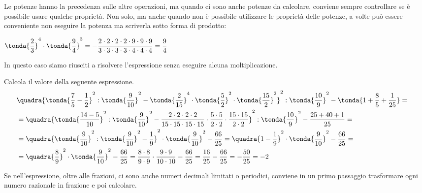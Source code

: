 Le potenze hanno la precedenza sulle altre operazioni, ma quando ci sono 
anche potenze da calcolare, conviene sempre controllare se è possibile usare 
qualche proprietà. Non solo, ma anche quando non è possibile utilizzare le 
proprietà delle potenze, a volte può essere conveniente non eseguire la 
potenza ma scriverla sotto forma di prodotto:

\begin{esempio}{}{}
\(\tonda{\dfrac{2}{3}}^4 \cdot \tonda{\dfrac{9}{4}}^3  = 
-\dfrac{2\cdot2\cdot2\cdot2\cdot9\cdot9\cdot9}
      {3\cdot3\cdot3\cdot3\cdot4\cdot4\cdot4} = \dfrac{9}{4}\)
\end{esempio}

In questo caso siamo riusciti a risolvere l'espressione senza eseguire
alcuna moltiplicazione.


\begin{esempio}{}{}
Calcola il valore della seguente espressione.
{\footnotesize
\begin{align*}
&\quadra{
  \tonda{\frac{7}{5}-\frac{1}{2}}^{2}:
  \tonda{\frac{9}{10}}^{2}-
  \tonda{\frac{2}{15}}^{4}\cdot
  \tonda{\frac{5}{2}}^2\cdot
  \tonda{\frac{15}{2}}^{2}
}^{2}:
\tonda{\frac{10}{9}}^{2}-
\tonda{1+\frac{8}{5}+\frac{1}{25}}=&\\
&=\quadra{
  \tonda{\frac{14 - 5}{10}}^{2}:
  \tonda{\frac{9}{10}}^{2}-
  \frac{2\cdot2\cdot2\cdot2}{15\cdot15\cdot15\cdot15}\cdot
  \frac{5\cdot5}{2\cdot2}\cdot
  \frac{15\cdot15}{2\cdot2}
}^{2}:
\tonda{\frac{10}{9}}^{2}-
\frac{25 + 40 + 1}{25}=\\
&=\quadra{
  \tonda{\frac{9}{10}}^{2}:
  \tonda{\frac{9}{10}}^{2}-
  \frac{1}{9}
}^{2}\cdot
\tonda{\frac{9}{10}}^{2}-
\frac{66}{25}=
\quadra{
  1 -\frac{1}{9}
}^{2}\cdot
\tonda{\frac{9}{10}}^{2}-
\frac{66}{25}=\\
&=\quadra{\frac{8}{9}}^{2}\cdot
\tonda{\frac{9}{10}}^{2}-
\frac{66}{25}=
\frac{8\cdot8}{9\cdot9}\cdot
\frac{9\cdot9}{10\cdot10}-
\frac{66}{25}=\frac{16}{25}-\frac{66}{25}=-\frac{50}{25}=-2
\end{align*}
}
\end{esempio}

Se nell'espressione, oltre alle frazioni, ci sono anche numeri decimali 
limitati o periodici, conviene in un primo passaggio trasformare ogni numero
razionale in frazione e poi calcolare.

